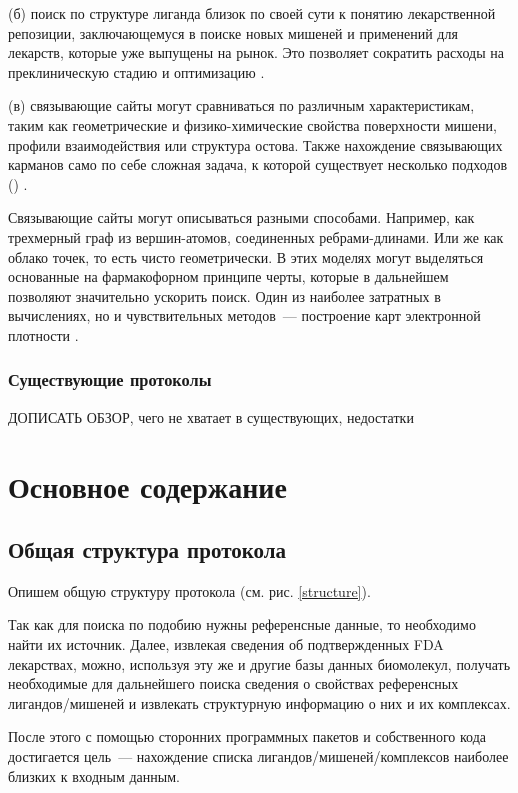 \documentclass[a4paper,14pt]{article}         %
\newcommand{\sic}[1]{\LARGE\color{orange}{#1}\color{black}\Large}
\begin{document}
(б) поиск по структуре лиганда близок по своей сути к понятию лекарственной репозиции, заключающемуся в поиске новых мишеней и применений для лекарств, которые уже выпущены на рынок. Это позволяет сократить расходы на преклиническую стадию и оптимизацию \cite{Hall2015, March-Vila2017}.

(в) связывающие сайты могут сравниваться по различным характеристикам, таким как геометрические и физико-химические свойства поверхности мишени, профили взаимодействия или структура остова. Также нахождение связывающих карманов само по себе сложная задача, к которой существует несколько подходов (\sic{добавить, как ее решать}) \cite{Ehrt2016}. 

Связывающие сайты могут описываться разными способами. Например, как трехмерный граф из вершин-атомов, соединенных ребрами-длинами. Или же как облако точек, то есть чисто геометрически. В этих моделях могут выделяться основанные на фармакофорном принципе черты, которые в дальнейшем позволяют значительно ускорить поиск. Один из наиболее затратных в вычислениях, но и чувствительных методов~--- построение карт электронной плотности \cite{Ehrt2016}.
\subsubsection{Существующие протоколы}
\color{orange} ДОПИСАТЬ ОБЗОР, чего не хватает в существующих, недостатки\cite{Chartier2017}
\color{black}


\newpage
\section{Основное содержание}
\subsection{Общая структура протокола}
Опишем общую структуру протокола (см. рис. \ref{structure}).

Так как для поиска по подобию нужны референсные данные, то необходимо найти их источник. Далее, извлекая сведения об подтвержденных FDA лекарствах, можно, используя эту же и другие базы данных биомолекул, получать необходимые для дальнейшего поиска сведения о свойствах референсных лигандов/мишеней и извлекать структурную информацию о них и их комплексах.

После этого с помощью сторонних программных пакетов и собственного кода достигается цель~--- нахождение списка лигандов/мишеней/комплексов наиболее близких к входным данным.
\end{document}
